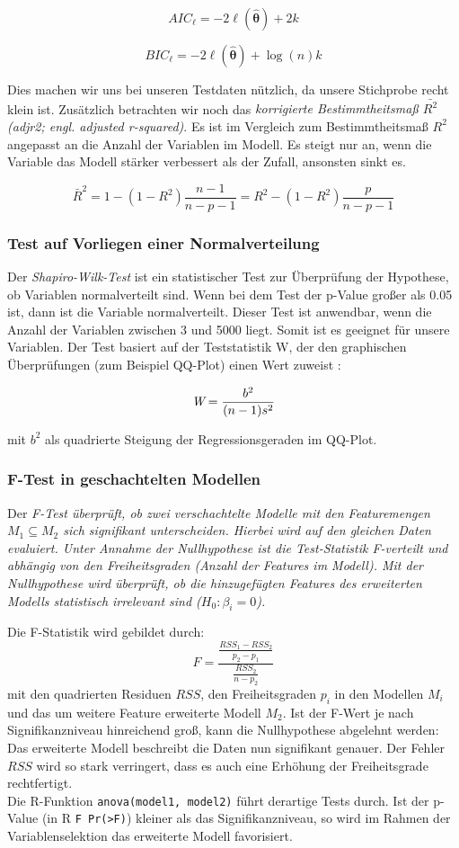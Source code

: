 $$\displaystyle AIC_{\ell }=-2\ell (\mathbf {\hat {\theta }} )+2k$$

$$\displaystyle BIC_{\ell }=-2\ell (\mathbf {\hat {\theta }} )+\log(n)k$$

Dies machen wir uns bei unseren Testdaten nützlich, da unsere Stichprobe recht klein ist. Zusätzlich betrachten wir noch das \emph{korrigierte Bestimmtheitsmaß  $\bar{R^2}$ (adjr2; engl. \it{adjusted r-squared})}. Es ist im Vergleich zum Bestimmtheitsmaß $R^2$ angepasst an die Anzahl der Variablen im Modell. Es steigt nur an, wenn die Variable das Modell stärker verbessert als der Zufall, ansonsten sinkt es.

$$\bar R^2 = 1- (1-R^2) \frac{n-1}{n-p-1} = R^2 - (1-R^2) \frac{p}{n-p-1}$$

\subsubsection{Test auf Vorliegen einer Normalverteilung}

Der \emph{Shapiro-Wilk-Test} ist ein statistischer Test zur Überprüfung der Hypothese, ob Variablen normalverteilt sind. Wenn bei dem Test der p-Value großer als 0.05 ist, dann ist die Variable normalverteilt.
Dieser Test ist anwendbar, wenn die Anzahl der Variablen zwischen 3 und 5000 liegt.
Somit ist es geeignet für unsere Variablen. Der Test basiert auf der Teststatistik W, der den graphischen Überprüfungen (zum Beispiel QQ-Plot) einen Wert zuweist \cite{2012shapiro}:

$$\textit{W} = {{b^2}\over {(n-1)s^2}}$$


\noindent mit $b^2$ als quadrierte Steigung der Regressionsgeraden im QQ-Plot.

\subsubsection{F-Test in geschachtelten Modellen}
Der \it{F-Test} überprüft, ob zwei verschachtelte Modelle mit den Featuremengen $M_1 \subseteq M_2$ sich signifikant unterscheiden.
Hierbei wird auf den gleichen Daten evaluiert.
Unter Annahme der Nullhypothese ist die Test-Statistik F-verteilt und abhängig von den Freiheitsgraden (Anzahl der Features im Modell).
Mit der Nullhypothese wird überprüft, ob die hinzugefügten Features des erweiterten Modells statistisch irrelevant sind ($H_0: \beta_i = 0$).

Die F-Statistik wird gebildet durch:
\begin{equation}
	F=\frac{\frac{RSS_1-RSS_2}{p_2-p_1}}{\frac{RSS_2}{n-p_2}}
\end{equation}
mit den quadrierten Residuen $RSS$, den Freiheitsgraden $p_i$ in den Modellen $M_i$ und das um weitere Feature erweiterte Modell $M_2$.
Ist der F-Wert je nach Signifikanzniveau hinreichend groß, kann die Nullhypothese abgelehnt werden:
Das erweiterte Modell beschreibt die Daten nun signifikant genauer.
Der Fehler $RSS$ wird so stark verringert, dass es auch eine Erhöhung der Freiheitsgrade rechtfertigt. 
\\
Die R-Funktion \lstinline|anova(model1, model2)| führt derartige Tests durch.
Ist der p-Value (in R \lstinline|F Pr(>F)|) kleiner als das Signifikanzniveau, so wird im Rahmen der Variablenselektion das erweiterte Modell favorisiert.
